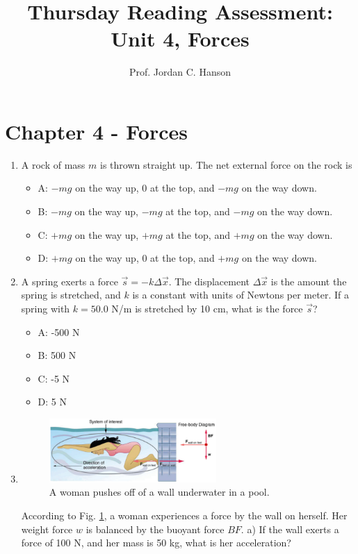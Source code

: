\documentclass{article}
\begin{document}
\title{Thursday Reading Assessment: Unit 4, Forces}
\author{Prof. Jordan C. Hanson}

\maketitle

\section{Chapter 4 - Forces}

\begin{enumerate}
\item A rock of mass $m$ is thrown straight up. The net external force on the rock is
\begin{itemize}
\item A: $-mg$ on the way up, 0 at the top, and $-mg$ on the way down.
\item B: $-mg$ on the way up, $-mg$ at the top, and $-mg$ on the way down.
\item C: $+mg$ on the way up, $+mg$ at the top, and $+mg$ on the way down.
\item D: $+mg$ on the way up, 0 at the top, and $+mg$ on the way down.
\end{itemize}
\item A spring exerts a force $\vec{s} = -k \Delta\vec{x}$.  The displacement $\Delta\vec{x}$ is the amount the spring is stretched, and $k$ is a constant with units of Newtons per meter.  If a spring with $k = 50.0$ N/m is stretched by 10 cm, what is the force $\vec{s}$?
\begin{itemize}
\item A: -500 N
\item B: 500 N
\item C: -5 N
\item D: 5 N
\end{itemize}
\item 
\begin{figure}[ht]
\centering
\includegraphics[width=0.6\textwidth]{wall.png}
\caption{\label{fig:wall} A woman pushes off of a wall underwater in a pool.}
\end{figure}
According to Fig. \ref{fig:wall}, a woman experiences a force by the wall on herself.  Her weight force $w$ is balanced by the buoyant force $BF$.  a) If the wall exerts a force of 100 N, and her mass is 50 kg, what is her acceleration?
\end{enumerate}
\end{document}
